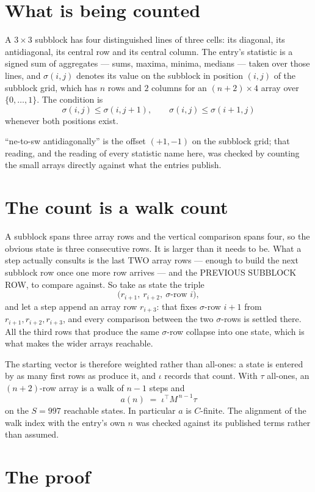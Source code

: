 \documentclass[11pt,a4paper]{article}
\theoremstyle{plain}
\theoremstyle{definition}
\begin{document}
\section{What is being counted}

A $3\times3$ subblock has four distinguished lines of three cells: its diagonal, its
antidiagonal, its central row and its central column. The entry's statistic is a signed sum of
aggregates --- sums, maxima, minima, medians --- taken over those lines, and $\sigma(i,j)$
denotes its value on the subblock in position $(i,j)$ of the subblock grid, which has $n$ rows
and $2$ columns for an $(n+2)\times4$ array over $\{0,\dots,1\}$. The condition is
\[
\sigma(i,j)\le\sigma(i,j+1),\qquad \sigma(i,j)\le\sigma(i+1,j)
\]
whenever both positions exist.

``ne-to-sw antidiagonally'' is the offset $(+1,-1)$ on the subblock grid; that reading, and
the reading of every statistic name here, was checked by counting the small arrays directly
against what the entries publish.

\section{The count is a walk count}

A subblock spans three array rows and the vertical comparison spans four, so the obvious state
is three consecutive rows. It is larger than it needs to be. What a step actually consults is
the last TWO array rows --- enough to build the next subblock row once one more row arrives ---
and the PREVIOUS SUBBLOCK ROW, to compare against. So take as state the triple
\[
\bigl(r_{i+1},\ r_{i+2},\ \sigma\text{-row }i\bigr),
\]
and let a step append an array row $r_{i+3}$: that fixes $\sigma$-row $i+1$ from
$r_{i+1},r_{i+2},r_{i+3}$, and every comparison between the two $\sigma$-rows is settled
there. All the third rows that produce the same $\sigma$-row collapse into one state, which is
what makes the wider arrays reachable.

The starting vector is therefore weighted rather than all-ones: a state is entered by as many
first rows as produce it, and $\iota$ records that count. With $\tau$ all-ones, an
$(n+2)$-row array is a walk of $n-1$ steps and
\[
a(n)\;=\;\iota^{\!\top}M^{\,n-1}\tau
\]
on the $S=997$ reachable states. In particular $a$ is $C$-finite. The alignment of the walk
index with the entry's own $n$ was checked against its published terms rather than assumed.

\section{The proof}
\end{document}
